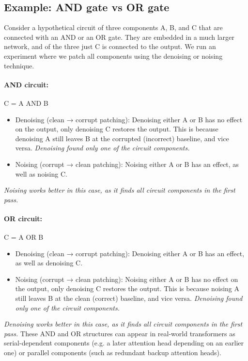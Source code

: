 \documentclass[nonatbib]{article}
\begin{document}
\subsection{Example: AND gate vs OR gate}
Consider a hypothetical circuit of three components A, B, and C that are connected with an AND or an OR gate. They are embedded in a much larger network, and of the three just C is connected to the output. We run an experiment where we patch all components using the denoising or noising technique.

\paragraph{AND circuit:} C = A AND B
\begin{itemize}
    \item Denoising (clean → corrupt patching): Denoising either A or B has no effect on the output, only denoising C restores the output. This is because denoising A still leaves B at the corrupted (incorrect) baseline, and vice versa. \textit{Denoising found only one of the circuit components.}
    \item Noising (corrupt → clean patching): Noising either A or B has an effect, as well as noising C.
\end{itemize}

\textit{Noising works better in this case, as it finds all circuit components in the first pass.
}
\paragraph{OR circuit:} C = A OR B
\begin{itemize}
    \item Denoising (clean → corrupt patching): Denoising either A or B has an effect, as well as denoising C.
    \item Noising (corrupt → clean patching): Noising either A or B has no effect on the output, only denoising C restores the output. This is because noising A still leaves B at the clean (correct) baseline, and vice versa. \textit{Denoising found only one of the circuit components.}
\end{itemize}

\textit{Denoising works better in this case, as it finds all circuit components in the first pass.
}
These AND and OR structures can appear in real-world transformers as serial-dependent components (e.g. a later attention head depending on an earlier one) or parallel components (such as redundant backup attention heads).
\end{document}
